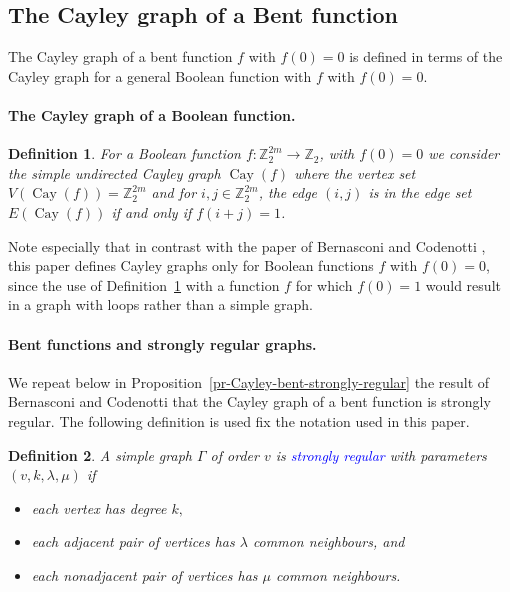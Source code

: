 \documentclass[12pt,a4paper]{article}
\newcommand{\mb}[1]{\mathbb{#1}}
\newcommand{\Z}{\mb{Z}}
\newcommand{\To}{\rightarrow}
\newcommand{\Emph}[1]{\emph{\textcolor{blue}{#1}}}
\newcommand{\Cay}[1]{\operatorname{Cay}\left(#1\right)}
\newtheorem{Definition}{Definition}
\begin{document}
\subsection{The Cayley graph of a Bent function}

The Cayley graph of a bent function $f$ with $f(0)=0$ is defined
in terms of the Cayley graph for a general Boolean function with $f$ with $f(0)=0$.
\paragraph*{The Cayley graph of a Boolean function.}
\begin{Definition}
\label{def-Cayley-graph}
For a Boolean function $f : \Z_2^{2 m} \To \Z_2$, with $f(0)=0$ we consider the simple undirected
\emph{Cayley graph} $\Cay{f}$  \cite[3.1]{BerC99}
where the vertex set $V(\Cay{f}) = \Z_2^{2 m}$ and for $i,j \in \Z_2^{2 m}$, the edge $(i,j)$ is in
the edge set $E(\Cay{f})$ if and only if $f(i+j)=1$.
\end{Definition}
Note especially that in contrast with the paper of Bernasconi and Codenotti \cite{BerC99},
this paper defines Cayley graphs only for Boolean functions $f$ with $f(0)=0$,
since the use of Definition~\ref{def-Cayley-graph} with a function $f$ for which $f(0)=1$ would
result in a graph with loops rather than a simple graph.

\paragraph*{Bent functions and strongly regular graphs.}
We repeat below in Proposition~\ref{pr-Cayley-bent-strongly-regular}
the result of Bernasconi and Codenotti \cite{BerC99}
that the Cayley graph of a bent function is strongly regular.
The following definition is used fix the notation used in this paper.
\begin{Definition}
\label{def-strongly-regular-graph}
%
A simple graph $\Gamma$ of order $v$ is \Emph{strongly regular} \cite{Bos63,BroCN89,Sei79} with
parameters
$(v,k,\lambda,\mu)$ if
\begin{itemize}
 \item
each vertex has degree $k,$
 \item
each adjacent pair of vertices has $\lambda$ common neighbours, and
\item
each nonadjacent pair of vertices has $\mu$ common neighbours.
\end{itemize}
%
\end{Definition}
%
\end{document}
